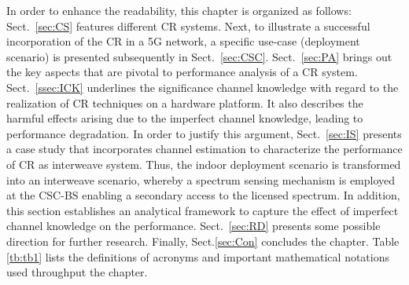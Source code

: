 In order to enhance the readability, this chapter is organized as follows: Sect.~\ref{sec:CS} features different CR systems. Next, to illustrate a successful incorporation of the CR in a 5G network, a specific use-case (deployment scenario) is presented subsequently in Sect.~\ref{sec:CSC}. Sect.~\ref{sec:PA} brings out the key aspects that are pivotal to performance analysis of a CR system. Sect.~\ref{ssec:ICK} underlines the significance channel knowledge with regard to the realization of CR techniques on a hardware platform. It also describes the harmful effects arising due to the imperfect channel knowledge, leading to performance degradation. In order to justify this argument, Sect.~\ref{sec:IS} presents a case study that incorporates channel estimation to characterize the performance of CR as interweave system. %
Thus, the indoor deployment scenario is transformed into an interweave scenario, whereby a spectrum sensing mechanism is employed at the CSC-BS enabling a secondary access to the licensed spectrum. In addition, this section establishes an analytical framework to capture the effect of imperfect channel knowledge on the performance. %
Sect.~\ref{sec:RD} presents some possible direction for further research. Finally, Sect.\ref{sec:Con} concludes the chapter.  Table \ref{tb:tb1} lists the definitions of acronyms and important mathematical notations used throughput the chapter. 
 
